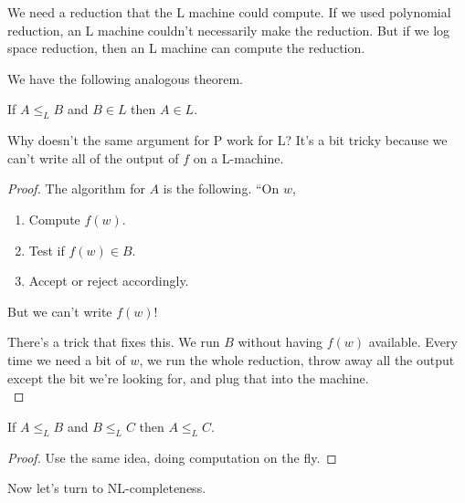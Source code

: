 We need a reduction that the L machine could compute. If we used polynomial reduction, an L machine couldn't necessarily make the reduction. But if we log space reduction, then an L machine can compute the reduction.

We have the following analogous theorem.
\begin{thm}
If $A\le_L B$ and $B\in L$ then $A\in L$.
\end{thm}
Why doesn't the same argument for P work for L? It's a bit tricky because we can't write all of the output of $f$ on a L-machine.
\begin{proof}
The algorithm for $A$ is the following. ``On $w$,
\begin{enumerate}
\item
Compute $f(w)$. 
\item 
Test if $f(w)\in B$.
\item Accept or reject accordingly.
\end{enumerate}
But we can't write $f(w)$!

There's a trick that fixes this. We run $B$ without having $f(w)$ available. Every time we need a bit of $w$, we run the whole reduction, throw away all the output except the bit we're looking for, and plug that into the machine.\\


\end{proof}
\begin{pr}
If $A\le_LB$ and $B\le_LC$ then $A\le_LC$. 
\end{pr}
\begin{proof}
Use the same idea, doing computation on the fly.
\end{proof}
Now let's turn to NL-completeness.
